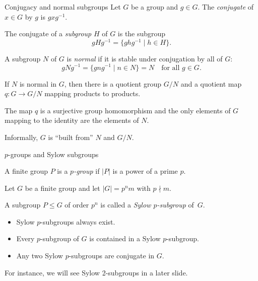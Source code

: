 \documentclass{beamer}
\newcommand{\inv}[1]{#1^{-1}}
\begin{document}
\begin{frame}{Conjugacy and normal subgroups}
Let $G$ be a group and $g\in G$.
The \emph{conjugate} of $x\in G$ by $g$ is $g x \inv{g}$.

\bigskip

The conjugate of a \emph{subgroup} $H$ of $G$ is the subgroup
\[
gHg^{-1}= \{gh\inv{g} \mid h \in H\}.
\]

\medskip

A subgroup $N$ of $G$ is \emph{normal} if it is stable under conjugation by all of $G$:
\[
gNg^{-1}= \{gn\inv{g} \mid n \in N\}=N \quad \text{for all } g\in G.
\]

\medskip

If $N$ is normal in $G$, then there is a quotient group $G/N$ and a quotient map $q \colon G \to G/N$ mapping products to products.

\medskip

The map $q$ is a surjective group homomorphism and the only elements of $G$ mapping to the identity are the elements of $N$.

\bigskip

Informally, $G$ is ``built from'' $N$ and $G/N$.

\end{frame}

\begin{frame}{$p$-groups and Sylow subgroups}

A finite group $P$ is a \emph{$p$-group} if $|P|$ is a power of a prime $p$.

\bigskip

Let $G$ be a finite group and let $|G|=p^n m$ with $p\nmid m$.

\bigskip

A subgroup $P\le G$ of order $p^n$ is called a \emph{Sylow $p$-subgroup} of~$G$.

\bigskip

\begin{itemize}
  \item Sylow $p$-subgroups always exist.
  \item Every $p$-subgroup of $G$ is contained in a Sylow $p$-subgroup.
  \item Any two Sylow $p$-subgroups are conjugate in $G$.
\end{itemize}

\bigskip

For instance, we will see Sylow 2-subgroups in a later slide.

\end{frame}
\end{document}
